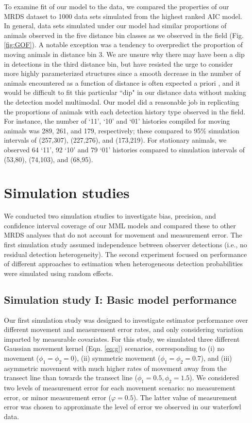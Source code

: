 \documentclass[aoas,preprint]{imsart}
\numberwithin{equation}{section}
\theoremstyle{plain}
\begin{document}
To examine fit of our model to the data, we compared the properties of our MRDS dataset to 1000 data sets simulated from the highest ranked AIC model.  In general, data sets simulated under our model had similar proportions of animals observed in the five distance bin classes as we observed in the field (Fig. \ref{fig:GOF}).  A notable exception was a tendency to overpredict the proportion of moving animals in distance bin 3.  We are unsure why there may have been a dip in detections in the third distance bin, but have resisted the urge to consider more highly parameterized structures since a smooth decrease in the number of animals encountered as a function of distance is often expected a priori \citep{BucklandEtAl2001}, and it would be difficult to fit this particular ``dip" in our distance data without making the detection model multimodal.  Our model did a reasonable job in replicating the proportions of animals with each detection history type observed in the field.  For instance, the number of `11', `10' and `01' histories compiled for moving animals was 289, 261, and 179, respectively; these compared to 95\% simulation intervals of (257,307), (227,276), and (173,219).  For stationary animals, we observed 64 `11', 92 `10' and 79 `01' histories compared to simulation intervals of (53,80), (74,103), and (68,95).


\section{Simulation studies}

We conducted two simulation studies to investigate bias, precision, and confidence interval coverage of our MML models and compared these to other MRDS analyses that do not account for movement and measurement error.  The first simulation study assumed independence between observer detections (i.e., no residual detection heterogeneity).  The second experiment focused on performance of different approaches to estimation when heterogeneous detection probabilities were simulated using random effects.

\subsection{Simulation study I: Basic model performance}

Our first simulation study was designed to investigate estimator performance over different movement and measurement error rates, and only considering variation imparted by measurable covariates.  For this study, we simulated  three different Gaussian movement kernel (Eqn. \ref{eq:g}) scenarios, corresponding to (i) no movement ($\phi_1 = \phi_2 = 0$), (ii) symmetric movement ($\phi_1 = \phi_2 = 0.7$), and (iii) asymmetric movement with much higher rates of movement away from the transect line than towards the transect line ($\phi_1 = 0.5, \phi_2 = 1.5$).  We considered two levels of measurement error for each movement scenario: no measurement error, or minor measurement error ($\varphi = 0.5$).  The latter value of measurement error was chosen to approximate the level of error we observed in our waterfowl data.
\end{document}
